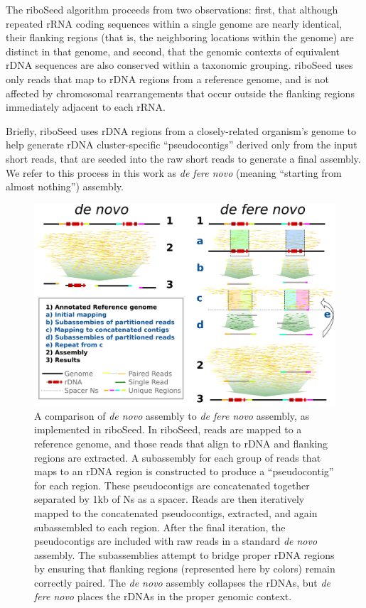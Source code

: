 \documentclass[a4,center,fleqn]{NAR}
\begin{document}
The riboSeed algorithm proceeds from two observations: first, that although repeated rRNA coding sequences within a single genome are nearly identical, their flanking regions (that is, the neighboring locations within the genome) are distinct in that genome, and second, that the genomic contexts of equivalent rDNA sequences are also conserved within a taxonomic grouping. riboSeed uses only reads that map to rDNA regions from a reference genome, and is not affected by chromosomal rearrangements that occur outside the flanking regions immediately adjacent to each rRNA.


Briefly, riboSeed uses rDNA regions from a closely-related organism's genome to help generate rDNA cluster-specific ``pseudocontigs'' derived only from the input short reads, that are seeded into the raw short reads to generate a final assembly. We refer to this process in this work as \textit{de fere novo} (meaning ``starting from almost nothing'') assembly.



\begin{figure}[t]
 \begin{center}
  \includegraphics[width=.85\textwidth]{riboSeed_v14}
  \end{center}
  \caption{A comparison of \textit{de novo} assembly to \textit{de fere novo} assembly, as implemented in riboSeed. In riboSeed, reads are mapped to a reference genome, and those reads that align to rDNA and flanking regions are extracted. A subassembly for each group of reads that maps to an rDNA region is constructed to produce a ``pseudocontig'' for each region. These pseudocontigs are concatenated together separated by 1kb of Ns as a spacer. Reads are then iteratively mapped to the concatenated pseudocontigs, extracted, and again subassembled to each region. After the final iteration, the pseudocontigs are included with raw reads in a standard \textit{de novo} assembly. The subassemblies attempt to bridge proper rDNA regions by ensuring that flanking regions (represented here by colors) remain correctly paired. The \textit{de novo} assembly collapses the rDNAs, but \textit{de fere novo} places the rDNAs in the proper genomic context.
  }
  \label{fig:overview}
\end{figure}
\end{document}
